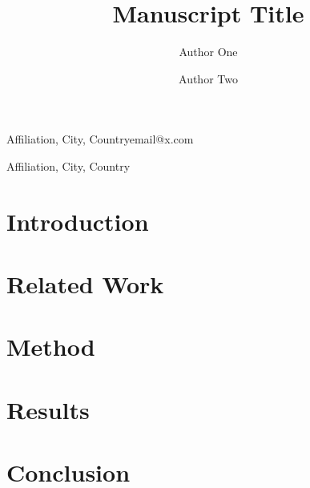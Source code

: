 \documentclass[sn-mathphys]{sn-jnl}
\begin{document}
\title{Manuscript Title}

\author{Author One}{Affiliation, City, Country}{email@x.com}
\author{Author Two}{Affiliation, City, Country}{}



\section{Introduction}

\section{Related Work}

\section{Method}

\section{Results}

\section{Conclusion}


\end{document}
